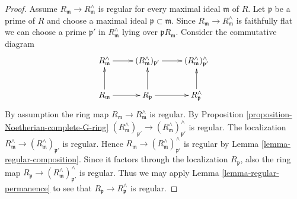 \documentclass[10pt,a4paper]{amsart}
\theoremstyle{plain}
\theoremstyle{definition}
\theoremstyle{remark}
\numberwithin{equation}{subsection}
\begin{document}
\begin{proof}
Assume $R_\mathfrak m \to R_\mathfrak m^\wedge$ is regular for every
maximal ideal $\mathfrak m$ of $R$. Let $\mathfrak p$ be a prime of
$R$ and choose a maximal ideal $\mathfrak p \subset \mathfrak m$.
Since $R_\mathfrak m \to R_\mathfrak m^\wedge$ is faithfully flat
we can choose a prime $\mathfrak p'$ in $R_\mathfrak m^\wedge$
lying over $\mathfrak pR_\mathfrak m$. Consider the commutative diagram
$$
\xymatrix{
R_\mathfrak m^\wedge \ar[r] &
(R_\mathfrak m^\wedge)_{\mathfrak p'} \ar[r] &
(R_\mathfrak m^\wedge)_{\mathfrak p'}^\wedge
\\
R_\mathfrak m \ar[u] \ar[r] & R_\mathfrak p \ar[u] \ar[r] &
R_\mathfrak p^\wedge \ar[u]
}
$$
By assumption the ring map $R_\mathfrak m \to R_\mathfrak m^\wedge$ is
regular. By Proposition \ref{proposition-Noetherian-complete-G-ring}
$(R_\mathfrak m^\wedge)_{\mathfrak p'} \to
(R_\mathfrak m^\wedge)_{\mathfrak p'}^\wedge$ is regular.
The localization
$R_\mathfrak m^\wedge \to (R_\mathfrak m^\wedge)_{\mathfrak p'}$ is regular.
Hence $R_\mathfrak m \to (R_\mathfrak m^\wedge)_{\mathfrak p'}^\wedge$
is regular by Lemma \ref{lemma-regular-composition}.
Since it factors through the localization $R_\mathfrak p$, also the ring map
$R_\mathfrak p \to (R_\mathfrak m^\wedge)_{\mathfrak p'}^\wedge$
is regular. Thus we may apply Lemma \ref{lemma-regular-permanence} to see that
$R_\mathfrak p \to R_\mathfrak p^\wedge$ is regular.
\end{proof}
\end{document}
